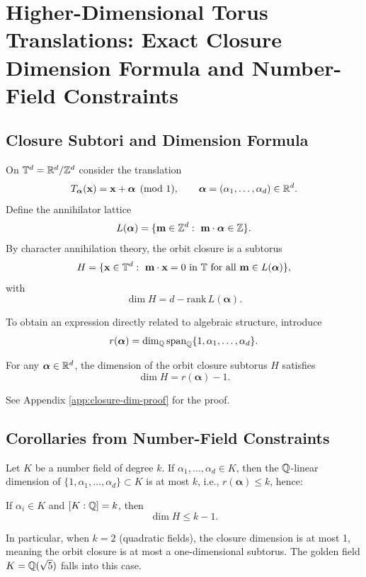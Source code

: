 \section{Higher-Dimensional Torus Translations: Exact Closure Dimension Formula and Number-Field Constraints}

\subsection{Closure Subtori and Dimension Formula}

On $\mathbb{T}^d=\mathbb{R}^d/\mathbb{Z}^d$ consider the translation
\[
T_{\boldsymbol{\alpha}}(\mathbf{x})=\mathbf{x}+\boldsymbol{\alpha}\pmod 1,\qquad \boldsymbol{\alpha}=(\alpha_1,\dots,\alpha_d)\in\mathbb{R}^d.
\]
Define the annihilator lattice
\[
L(\boldsymbol{\alpha})=\{\mathbf{m}\in\ZZ^d:\ \mathbf{m}\cdot\boldsymbol{\alpha}\in\ZZ\}.
\]
By character annihilation theory, the orbit closure is a subtorus
\[
H=\{\mathbf{x}\in\mathbb{T}^d:\ \mathbf{m}\cdot \mathbf{x}=0\ \text{in}\ \mathbb{T}\ \text{for all}\ \mathbf{m}\in L(\boldsymbol{\alpha})\},
\]
with
\[
\dim H=d-\mathrm{rank}\,L(\boldsymbol{\alpha}).
\]

To obtain an expression directly related to algebraic structure, introduce
\[
r(\boldsymbol{\alpha})=\dim_{\mathbb{Q}}\mathrm{span}_{\mathbb{Q}}\{1,\alpha_1,\dots,\alpha_d\}.
\]

\begin{theorem}\label{thm:closure-dim}
For any $\boldsymbol{\alpha}\in\mathbb{R}^d$, the dimension of the orbit closure subtorus $H$ satisfies
\[
\dim H=r(\boldsymbol{\alpha})-1.
\]
\end{theorem}
See Appendix \ref{app:closure-dim-proof} for the proof.

\subsection{Corollaries from Number-Field Constraints}

Let $K$ be a number field of degree $k$. If $\alpha_1,\dots,\alpha_d\in K$, then the $\mathbb{Q}$-linear dimension of $\{1,\alpha_1,\dots,\alpha_d\}\subset K$ is at most $k$, i.e., $r(\boldsymbol{\alpha})\le k$, hence:

\begin{corollary}
If $\alpha_i\in K$ and $[K:\mathbb{Q}]=k$, then
\[
\dim H\le k-1.
\]
\end{corollary}

In particular, when $k=2$ (quadratic fields), the closure dimension is at most 1, meaning the orbit closure is at most a one-dimensional subtorus. The golden field $K=\mathbb{Q}(\sqrt 5)$ falls into this case.

